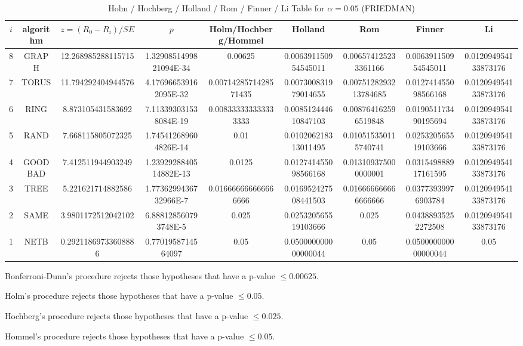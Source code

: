 \documentclass[a4paper,10pt]{article}
\begin{document}
\begin{landscape}
\begin{table}[!htp]
\begin{tabular}{
|r|r|r|r|r|r|r|r|r|r|}
\end{tabular}
\end{table}

\newpage

\begin{table}[!htp]
\centering\scriptsize
\caption{Holm / Hochberg / Holland / Rom / Finner / Li Table for $\alpha=0.05$ (FRIEDMAN)}
\begin{tabular}{ccccccccc}
$i$&algorithm&$z=(R_0 - R_i)/SE$&$p$&Holm/Hochberg/Hommel&Holland&Rom&Finner&Li\\
\hline
8& GRAPH&12.268985288115715&1.3290851499821094E-34&0.00625&0.006391150954545011&0.006574125233361166&0.006391150954545011&0.012094954133873176\\
7& TORUS&11.794292404944576&4.176966539162095E-32&0.0071428571428571435&0.007300831979014655&0.0075128293213784685&0.012741455098566168&0.012094954133873176\\
6& RING&8.873105431583692&7.113393031538084E-19&0.008333333333333333&0.008512444610847103&0.008764162596519848&0.019051173490195694&0.012094954133873176\\
5& RAND&7.668115805072325&1.745412689604826E-14&0.01&0.010206218313011495&0.010515350115740741&0.025320565519103666&0.012094954133873176\\
4& GOODBAD&7.412511944903249&1.2392928840514882E-13&0.0125&0.012741455098566168&0.013109375000000001&0.031549888917161595&0.012094954133873176\\
3& TREE&5.221621714882586&1.7736299436732966E-7&0.016666666666666666&0.016952427508441503&0.016666666666666666&0.03773939976903784&0.012094954133873176\\
2& SAME&3.9801172512042102&6.888128560793748E-5&0.025&0.025320565519103666&0.025&0.04388935252272508&0.012094954133873176\\
1& NETB&0.29211869733608886&0.7701958714564097&0.05&0.050000000000000044&0.05&0.050000000000000044&0.05\\
\hline
\end{tabular}
\end{table}
Bonferroni-Dunn's procedure rejects those hypotheses that have a p-value $\le0.00625$.


Holm's procedure rejects those hypotheses that have a p-value $\le0.05$.


Hochberg's procedure rejects those hypotheses that have a p-value $\le0.025$.


Hommel's procedure rejects those hypotheses that have a p-value $\le0.05$.



\end{landscape}
\end{document}
